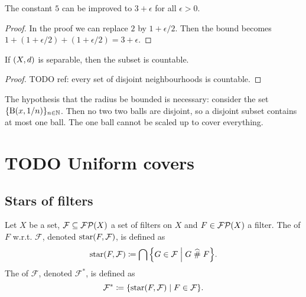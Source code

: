 \begin{corollary} \label{improvedConstant5foldCoveringLemma}
The constant $5$ can be improved to $3+\epsilon$ for all $\epsilon >0$.
\end{corollary}
\begin{proof}
In the proof we can replace $2$ by $1+\epsilon/2$. Then the bound becomes $1+(1+\epsilon/2) + (1+\epsilon/2) = 3+\epsilon$.
\end{proof}
\begin{corollary}
If $\sSet{X,d}$ is separable, then the subset is countable.
\end{corollary}
\begin{proof}
TODO ref: every set of disjoint neighbourhoods is countable.
\end{proof}

\begin{example}
The hypothesis that the radius be bounded is necessary: consider the set $\{\operatorname{B}(x, 1/n)\}_{n\in \mathbb{N}}$. Then no two two balls are disjoint, so a disjoint subset contains at most one ball. The one ball cannot be scaled up to cover everything.
\end{example}

\section{TODO Uniform covers}
\subsection{Stars of filters}
\begin{definition}
Let $X$ be a set, $\mathcal{F} \subseteq \operatorname{\mathcal{FP}}(X)$ a set of filters on $X$ and $F\in\operatorname{\mathcal{FP}}(X)$ a filter. The  of $F$ w.r.t. $\mathcal{F}$, denoted $\operatorname{star}(F,\mathcal{F})$, is defined as
\[ \starFilter(F,\mathcal{F}) \defeq \bigcap \setbuilder{G\in \mathcal{F}}{G \amesh F}. \]
The  of $\mathcal{F}$, denoted $\mathcal{F}^*$, is defined as
\[ \mathcal{F}^* \defeq \setbuilder{\starFilter(F,\mathcal{F})}{F\in \mathcal{F}}. \]
\end{definition}

